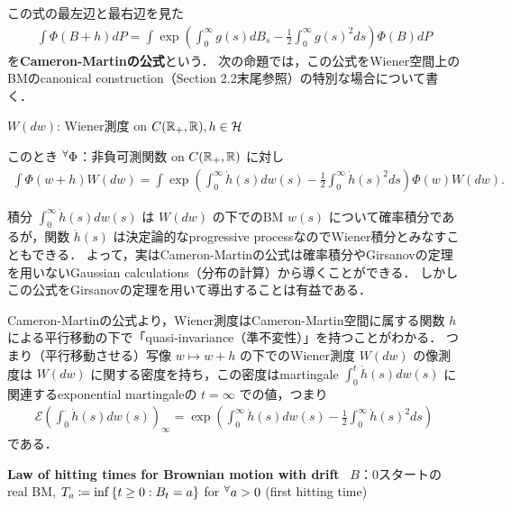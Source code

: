 \documentclass{jsarticle}
\begin{document}
この式の最左辺と最右辺を見た
\begin{align}
    \int \Phi(B+h)dP
    = \int\exp\left(\int_0^\infty g(s)dB_s-\frac{1}{2}\int_0^\infty g(s)^2 ds\right)\Phi(B)dP
\end{align}
を\textbf{Cameron-Martinの公式}という．
次の命題では，この公式をWiener空間上のBMのcanonical construction（Section 2.2末尾参照）の特別な場合について書く．

\begin{shadebox}
    \begin{prop}
    \label{thm:524}
        $W(dw)$: Wiener測度 on $C(\mathbb{R}_+,\mathbb{R}), h\in\mathcal{H}$

        このとき ${}^{\forall} \Phi$：非負可測関数 on $C(\mathbb{R}_+,\mathbb{R})$ に対し
        \begin{align}
            \int \Phi(w+h)W(dw)
            = \int\exp\left(\int_0^\infty \dot{h}(s)dw(s)-\frac{1}{2}\int_0^\infty \dot{h}(s)^2 ds\right)\Phi(w)W(dw).
        \end{align}
    \end{prop}  
\end{shadebox}

\begin{remark*}
    積分 $\int_0^\infty\dot{h}(s)dw(s)$ は $W(dw)$ の下でのBM $w(s)$ について確率積分であるが，関数 $\dot{h}(s)$ は決定論的なprogressive processなのでWiener積分とみなすこともできる．
    よって，実はCameron-Martinの公式は確率積分やGirsanovの定理を用いないGaussian calculations（分布の計算）から導くことができる．
    しかしこの公式をGirsanovの定理を用いて導出することは有益である．

    Cameron-Martinの公式より，Wiener測度はCameron-Martin空間に属する関数 $h$ による平行移動の下で「quasi-invariance（準不変性）」を持つことがわかる．
    つまり（平行移動させる）写像 $w\mapsto w+h$ の下でのWiener測度 $W(dw)$ の像測度は $W(dw)$ に関する密度を持ち\nazo，この密度はmartingale $\int_0^t \dot{h}(s)dw(s)$ に関連するexponential martingaleの $t=\infty$ での値，つまり
    \begin{align}
        \mathcal{E}\left(\int_0^{\cdot}\dot{h}(s)dw(s)\right)_\infty
        = \exp\left(\int_0^\infty \dot{h}(s)dw(s)-\frac{1}{2}\int_0^\infty \dot{h}(s)^2 ds\right)
    \end{align}
    である．
\end{remark*}
\hrulefill

\textbf{Law of hitting times for Brownian motion with drift}~
$B$：0スタートのreal BM, $T_a\coloneqq\inf\left\{t\ge0:B_t=a\right\}$ for ${}^{\forall} a>0$ (first hitting time)
\end{document}
